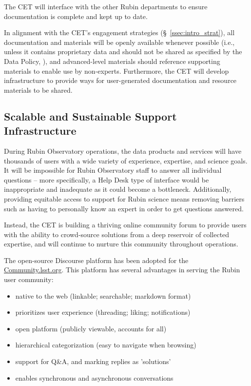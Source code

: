 \documentclass[DM,lsstdraft,toc]{lsstdoc}
\begin{document}
The CET will interface with the other Rubin departments to ensure documentation is complete and kept up to date.

In alignment with the CET's engagement strategies (\S~\ref{ssec:intro_strat}), all documentation and materials will be openly available whenever possible (i.e., unless it contains proprietary data and should not be shared as specified by the Data Policy, ), and advanced-level materials should reference supporting materials to enable use by non-experts.
Furthermore, the CET will develop infrastructure to provide ways for user-generated documentation and resource materials to be shared.


\subsection{Scalable and Sustainable Support Infrastructure}\label{ssec:mod_support}

During Rubin Observatory operations, the data products and services will have thousands of users with a wide variety of experience, expertise, and science goals.
It will be impossible for Rubin Observatory staff to answer all individual questions -- more specifically, a Help Desk type of interface would be inappropriate and inadequate as it could become a bottleneck.
Additionally, providing equitable access to support for Rubin science means removing barriers such as having to personally know an expert in order to get questions answered.

Instead, the CET is building a thriving online community forum to provide users with the ability to crowd-source solutions from a deep reservoir of collected expertise, and will continue to nurture this community throughout operations.

The open-source Discourse platform has been adopted for the \url{Community.lsst.org}.
This platform has several advantages in serving the Rubin user community:
\begin{itemize}
\item native to the web (linkable; searchable; markdown format)
\item prioritizes user experience (threading; liking; notifications)
\item open platform (publicly viewable, accounts for all)
\item hierarchical categorization (easy to navigate when browsing)
\item support for Q\&A, and marking replies as 'solutions'
\item enables synchronous and asynchronous conversations
\end{itemize}
\end{document}
